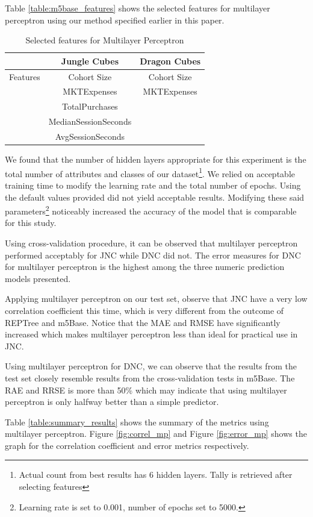 Table \ref{table:m5base_features} shows the selected features for multilayer perceptron using our method specified earlier in this paper.

\begin{table}[h]
\centering
\caption{Selected features for Multilayer Perceptron}
\label{table:mp_features}
\begin{tabular}{|c|c|c|}
\hline 
 & Jungle Cubes & Dragon Cubes\\ 
\hline 
Features & Cohort Size & Cohort Size 
\\& MKTExpenses & MKTExpenses 
\\& TotalPurchases &
\\& MedianSessionSeconds &
\\& AvgSessionSeconds &  
\\ 
\hline 
\end{tabular}
\end{table}

We found that the number of hidden layers appropriate for this experiment is the total number of attributes and classes of our dataset\footnote{Actual count from best results has 6 hidden layers. Tally is retrieved after selecting features}. We relied on acceptable training time to modify the learning rate and the total number of epochs. Using the default values provided did not yield acceptable results. Modifying these said parameters\footnote{Learning rate is set to 0.001, number of epochs set to 5000.} noticeably increased the accuracy of the model that is comparable for this study.

Using cross-validation procedure, it can be observed that multilayer perceptron performed acceptably for JNC while DNC did not. The error measures for DNC for multilayer perceptron is the highest among the three numeric prediction models presented.

Applying multilayer perceptron on our test set, observe that JNC have a very low correlation coefficient this time, which is very different from the outcome of REPTree and m5Base. Notice that the MAE and RMSE have significantly increased which makes multilayer perceptron less than ideal for practical use in JNC.

Using multilayer perceptron for DNC, we can observe that the results from the test set closely resemble results from the cross-validation tests in m5Base. The RAE and RRSE is more than 50\% which may indicate that using multilayer perceptron is only halfway better than a simple predictor. 

Table \ref{table:summary_results} shows the summary of the metrics using multilayer perceptron. Figure \ref{fig:correl_mp} and Figure \ref{fig:error_mp} shows the graph for the correlation coefficient and error metrics respectively.

